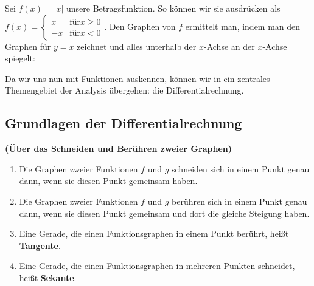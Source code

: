 \documentclass[ngerman, 12pt]{nssheetxea}
\begin{document}
\begin{example}
Sei $f(x)=|x|$ unsere Betragsfunktion. So können wir sie ausdrücken als $f(x)=\begin{cases} x & \mathrm{für} x\geq 0 \\ -x & \mathrm{für} x<0
\end{cases}$. Den Graphen von $f$ ermittelt man, indem man den Graphen für $y=x$ zeichnet und alles unterhalb der $x$-Achse an der $x$-Achse spiegelt:

\begin{center}
\end{center}

\end{example}

Da wir uns nun mit Funktionen auskennen, können wir in ein zentrales Themengebiet der Analysis übergehen: die Differentialrechnung.

\newpage


\subsection{Grundlagen der Differentialrechnung}


\begin{definition} \textbf{(Über das Schneiden und Berühren zweier Graphen)} 
\begin{enumerate}
\item Die Graphen zweier Funktionen $f$ und $g$ schneiden  sich in einem Punkt genau dann, wenn sie diesen Punkt gemeinsam haben.
\item Die Graphen zweier Funktionen $f$ und $g$ berühren sich in einem Punkt genau dann, wenn sie diesen Punkt gemeinsam und dort die gleiche Steigung haben.
\item Eine Gerade, die einen Funktionsgraphen in einem Punkt berührt, heißt \textbf{Tangente}. 
\item Eine Gerade, die einen Funktionsgraphen in mehreren Punkten schneidet, heißt \textbf{Sekante}. 
\end{enumerate}
\end{definition} 
\end{document}
